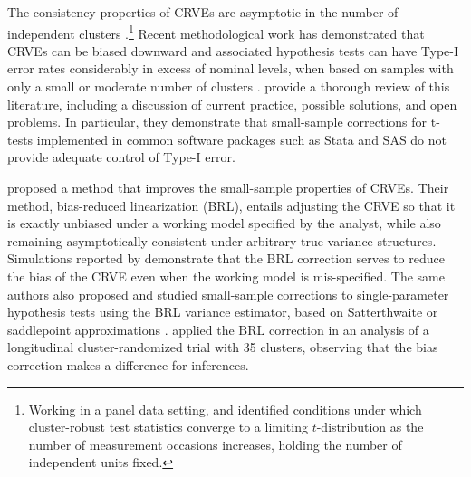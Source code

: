 \documentclass[12pt]{article}\usepackage[]{graphicx}\usepackage[]{color}
\begin{document}
The consistency properties of CRVEs are asymptotic in the number of independent clusters \citep{Wooldridge2003cluster}.\footnote{Working in a panel data setting, \citet{Hansen2007asymptotic} and \citet{Donald2007inference} identified conditions under which cluster-robust test statistics converge to a limiting $t$-distribution as the number of measurement occasions increases, holding the number of independent units fixed.}
Recent methodological work has demonstrated that CRVEs can be biased downward and associated hypothesis tests can have Type-I error rates considerably in excess of nominal levels, when based on samples with only a small or moderate number of clusters \citep[e.g.,][]{Webb2013wild}.
\citet{Cameron2015practitioners} provide a thorough review of this literature, including a discussion of current practice, possible solutions, and open problems. 
In particular, they demonstrate that small-sample corrections for t-tests implemented in common software packages such as Stata and SAS do not provide adequate control of Type-I error. 

\citet[see also \citealt{McCaffrey2001generalizations}]{Bell2002bias} proposed a method that improves the small-sample properties of CRVEs. 
Their method, bias-reduced linearization (BRL), entails adjusting the CRVE so that it is exactly unbiased under a working model specified by the analyst, while also remaining asymptotically consistent under arbitrary true variance structures. 
Simulations reported by \citet{Bell2002bias} demonstrate that the BRL correction serves to reduce the bias of the CRVE even when the working model is mis-specified. 
The same authors also proposed and studied small-sample corrections to single-parameter hypothesis tests using the BRL variance estimator, based on Satterthwaite \citep{Bell2002bias} or saddlepoint approximations \citep{McCaffrey2006improved}. 
\citet{Angrist2009effects} applied the BRL correction in an analysis of a longitudinal cluster-randomized trial with 35 clusters, observing that the bias correction makes a difference for inferences. 
\end{document}
